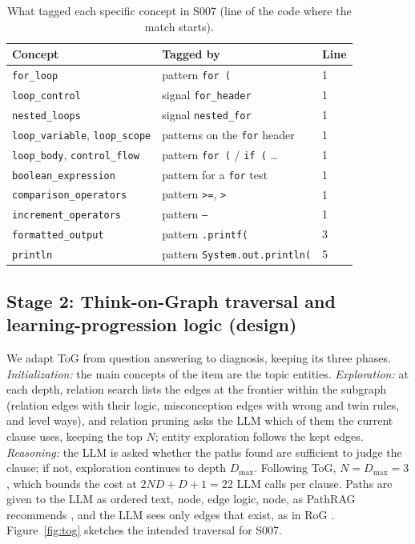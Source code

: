 \documentclass[sigconf,nonacm]{acmart}
\newcommand{\code}[1]{\texttt{#1}}
\begin{document}
\begin{table}[t]
\caption{What tagged each specific concept in S007 (line of the code where the match starts).}
\label{tab:s007tags}
\footnotesize
\begin{tabular}{@{}lll@{}}
\toprule
Concept & Tagged by & Line \\
\midrule
\code{for\_loop} & pattern \code{for (} & 1 \\
\code{loop\_control} & signal \code{for\_header} & 1 \\
\code{nested\_loops} & signal \code{nested\_for} & 1 \\
\code{loop\_variable}, \code{loop\_scope} & patterns on the \code{for} header & 1 \\
\code{loop\_body}, \code{control\_flow} & pattern \code{for (} / \code{if (} \ldots & 1 \\
\code{boolean\_expression} & pattern for a \code{for} test & 1 \\
\code{comparison\_operators} & pattern \code{>=}, \code{>} & 1 \\
\code{increment\_operators} & pattern \code{--} & 1 \\
\code{formatted\_output} & pattern \code{.printf(} & 3 \\
\code{println} & pattern \code{System.out.println(} & 5 \\
\bottomrule
\end{tabular}
\end{table}

\subsection{Stage 2: Think-on-Graph traversal and learning-progression logic (design)}
\label{sec:stage2}
We adapt ToG \cite{sun2024tog} from question answering to diagnosis, keeping its three phases.
\emph{Initialization:} the main concepts of the item are the topic entities. \emph{Exploration:} at each depth,
relation search lists the edges at the frontier within the subgraph (relation edges with their logic, misconception
edges with wrong and twin rules, and level ways), and relation pruning asks the LLM which of them the current
clause uses, keeping the top $N$; entity exploration follows the kept edges. \emph{Reasoning:} the LLM is asked
whether the paths found are sufficient to judge the clause; if not, exploration continues to depth $D_{\max}$.
Following ToG, $N=D_{\max}=3$, which bounds the cost at $2ND+D+1=22$ LLM calls per clause. Paths are given to
the LLM as ordered text, node, edge logic, node, as PathRAG recommends \cite{chen2026pathrag}, and the LLM sees
only edges that exist, as in RoG \cite{luo2024rog}. Figure~\ref{fig:tog} sketches the intended traversal for S007.
\end{document}
